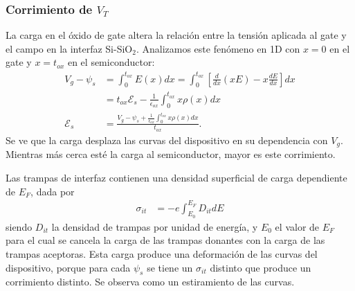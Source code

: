 \subsubsection{Corrimiento de $V_T$}
\label{corrimientovt}
La carga en el óxido de gate altera la relación 
entre la tensión aplicada al gate y el campo en la interfaz Si-SiO$_2$.
Analizamos este fenómeno en 1D con $x=0$ en el gate y $x=t_{ox}$
en el semiconductor:
\begin{align*}
    V_g-\psi_s&=\int_0^{t_{ox}}E(x)dx=
    \int_0^{t_{ox}}\left[\frac d{dx}(xE)-x\frac{dE}{dx}\right]dx\\
    &=t_{ox}\mathscr{E}_s-\frac 1{\epsilon_{ox}}\int_0^{t_{ox}}x\rho(x)dx\\
    \mathscr{E}_s &= \frac{V_g-\psi_s+
        \frac 1{\epsilon_{ox}}\int_0^{t_{ox}}x\rho(x)dx}{t_{ox}}.
\end{align*}
Se ve que la carga desplaza las curvas del dispositivo 
en su dependencia con $V_g$.
Mientras más cerca esté la carga al semiconductor,
mayor es este corrimiento.

Las trampas de interfaz contienen una densidad superficial de carga dependiente
de $E_F$, dada por
\begin{align*}
    \sigma_{it} &= -e\int_{E_0}^{E_F} D_{it}dE
\end{align*}
siendo $D_{it}$ la densidad de trampas por unidad de energía,
y $E_0$ el valor de $E_F$ para el cual se cancela la carga de las trampas
donantes con la carga de las trampas aceptoras.
Esta carga produce una deformación de las curvas del dispositivo,
porque para cada $\psi_s$ se tiene un $\sigma_{it}$ distinto que produce un
corrimiento distinto.
Se observa como un estiramiento de las curvas.
